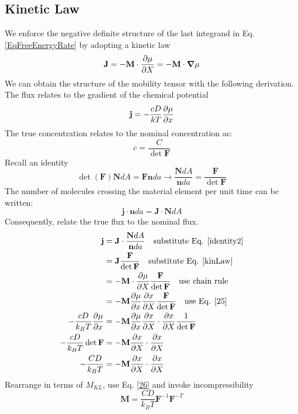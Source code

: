 \documentclass[12pt,3p]{article}
\numberwithin{equation}{section}
\begin{document}
\subsection{Kinetic Law}
\vspace{-1ex}
We enforce the negative definite structure of the last integrand in Eq. \ref{EqFreeEnergyRate} by adopting a kinetic law
\begin{equation}\label{EqKinLaw}
\mathbf{J} = - \mathbf{M} \cdot \pdv{\mu}{X} = - \mathbf{M} \cdot \grad \mu
\end{equation}
We can obtain the structure of the mobility tensor with the following derivation. The flux relates to the gradient of the chemical potential
\begin{equation}\label{25}
\mathbf{j} = - \frac{cD}{kT} \pdv{\mu}{x}
\end{equation}
The true concentration relates to the nominal concentration as: 
\begin{equation}\label{26}
c = \frac{C}{\det \mathbf{F}}
\end{equation}
Recall an identity 
\begin{equation}\label{identity2}
\det (\mathbf{F}) \mathbf{N} dA = \mathbf{F} \mathbf{n} da \rightarrow \frac{\mathbf{N} dA}{\mathbf{n} da} = \frac{\mathbf{F}}{\det \mathbf{F}}
\end{equation}
The number of molecules crossing the material element per unit time can be written:
\begin{equation}\label{27}
\mathbf{j} \cdot \mathbf{n} da = \mathbf{J} \cdot \mathbf{N} dA
\end{equation}
Consequently, relate the true flux to the nominal flux.
\begin{align*}
\mathbf{j} &= \mathbf{J} \cdot \frac{\mathbf{N} dA}{\mathbf{n} da} \quad \text{substitute Eq. \ref{identity2}}\\
    &= \mathbf{J} \frac{\mathbf{F}}{\det \mathbf{F}} \quad \text{substitute Eq. \ref{kinLaw}} \\
    &= -\mathbf{M} \cdot \pdv{\mu}{X} \frac{\mathbf{F}}{\det \mathbf{F}} \quad \text{use chain rule} \\
    &= - \mathbf{M} \pdv{\mu}{x} \pdv{x}{X} \frac{\mathbf{F}}{\det \mathbf{F}} \quad \text{use Eq. \ref{25}} \\
- \frac{cD}{k_B T} \pdv{\mu}{x} &= - \mathbf{M} \pdv{\mu}{x} \pdv{x}{X} \cdot \pdv{x}{X} \frac{1}{\det \mathbf{F}} \\
- \frac{cD}{k_B T} \det \mathbf{F} &= - \mathbf{M} \pdv{x}{X} \cdot \pdv{x}{X} \\
- \frac{CD}{k_B T} &= - \mathbf{M} \pdv{x}{X} \cdot \pdv{x}{X} \\
\end{align*}
Rearrange in terms of $M_{KL}$, use Eq. \ref{26} and invoke incompressibility
\begin{equation}\label{EqMobilityTensor}
\mathbf{M} = \frac{CD}{k_B T} \mathbf{F}^{-1} \mathbf{F}^{-T} 
\end{equation}
\end{document}
